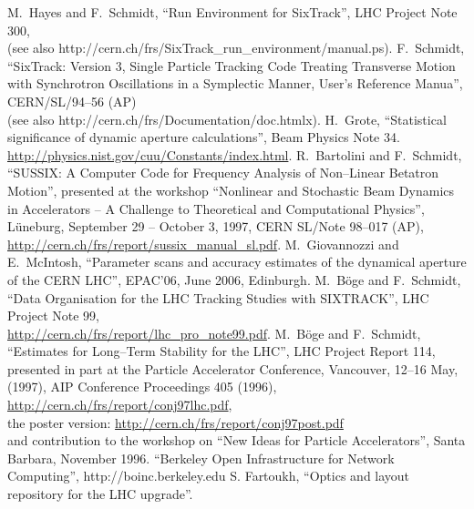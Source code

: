 \documentclass{cernatsnote}
\newcommand{\myhref}[2]{\href{#1}{\color{blue}#2}}
\begin{document}
\begin{thebibliography}{99}
%
 M.~Hayes and F.~Schmidt, ``Run Environment for SixTrack'',
  LHC Project Note 300,\\
  (see also http://cern.ch/frs/SixTrack\_run\_environment/manual.ps).
%
 F.~Schmidt, ``SixTrack: Version 3, Single Particle
  Tracking Code Treating Transverse Motion with Synchrotron
  Oscillations in a Symplectic Manner, User's Reference Manua'',
  CERN/SL/94--56 (AP)\\
  (see also http://cern.ch/frs/Documentation/doc.htmlx).
%
 H.~Grote, ``Statistical significance of dynamic
  aperture calculations'', Beam Physics Note 34.
%
 \myhref{http://physics.nist.gov/cuu/Constants/index.html}
  {http://physics.nist.gov/cuu/Constants/index.html}.
%
 R.~Bartolini and F.~Schmidt, ``SUSSIX: A Computer
  Code for Frequency Analysis of Non--Linear Betatron Motion'',
  presented at the workshop ``Nonlinear and Stochastic Beam Dynamics
  in Accelerators -- A Challenge to Theoretical and Computational
  Physics'', L\"uneburg, September 29 -- October 3, 1997, CERN SL/Note
  98--017 (AP),
  \myhref{http://cern.ch/frs/report/sussix_manual_sl.pdf}
  {http://cern.ch/frs/report/sussix\_manual\_sl.pdf}.
%
M.~Giovannozzi and E.~McIntosh, ``Parameter scans and accuracy estimates
of the dynamical aperture of the CERN LHC'', EPAC'06, June 2006, Edinburgh.
%
 M.~B\"oge and F.~Schmidt, ``Data Organisation for
  the LHC Tracking Studies with SIXTRACK'', LHC Project Note 99,\\
  \myhref{http://cern.ch/frs/report/lhc_pro_note99.pdf}
  {http://cern.ch/frs/report/lhc\_pro\_note99.pdf}.
%
 M.~B\"oge and F.~Schmidt, ``Estimates for Long--Term
  Stability for the LHC'', LHC Project Report 114, presented in part
  at the Particle Accelerator Conference, Vancouver, 12--16 May,
  (1997), AIP Conference Proceedings 405 (1996),
  \myhref{http://cern.ch/frs/report/conj97lhc.pdf}
  {http://cern.ch/frs/report/conj97lhc.pdf},\\
  the poster version:
  \myhref{http://cern.ch/frs/report/conj97post.pdf}
  {http://cern.ch/frs/report/conj97post.pdf} \\
  and contribution to the workshop on ``New Ideas for Particle
  Accelerators'', Santa Barbara, November 1996.
%
 ``Berkeley Open Infrastructure for Network Computing'',
   http://boinc.berkeley.edu
 S. Fartoukh, ``Optics and layout repository for the LHC upgrade''.

\end{thebibliography}

\clearpage
\end{document}
